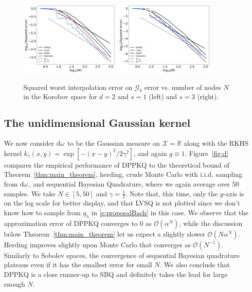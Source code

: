 \documentclass[twoside,11pt]{book}
\numberwithin{theorem}{chapter}
\numberwithin{definition}{chapter}
\numberwithin{proposition}{chapter}
\numberwithin{corollary}{chapter}
\numberwithin{example}{chapter}
\numberwithin{lemma}{chapter}
\newcommand{\rb}[1]{\textcolor{magenta}{#1}}
\begin{document}
\begin{figure}
\centering
\includegraphics[width=0.45\textwidth]{img/neurips/multiSobolev/suponunitball_interpolation_Korobov_s_1_binarycubeM_16_fig_1.pdf}
\includegraphics[width=0.45\textwidth]{img/neurips/multiSobolev/suponunitball_interpolation_Korobov_s_2_binarycubeM_16_fig_1.pdf}
\caption{Squared worst interpolation error on $\mathcal{G}_{4}$ error vs. number of nodes $N$ in the Korobov space for $d=2$ and $s = 1$ (left) and $s=3$ (right).
\label{fig:Korobov_DPPKQ_suponunitball_results_G4}}
\end{figure} 




\subsection{The unidimensional Gaussian kernel}\label{s:gaussian_numsim}
We now consider $\rm{d}\omega$ to be the Gaussian measure on $\mathcal{X} = \mathbb{R}$ along with the RKHS kernel $\displaystyle k_{\gamma}(x,y) = \exp[-(x-y)^{2}/2\gamma^{2}]$, and again $g\equiv 1$. Figure~\ref{fig:d} compares the empirical performance of DPPKQ to the theoretical bound of Theorem~\ref{thm:main_theorem}, herding, crude Monte Carlo with i.i.d. sampling from $\rm{d}\omega$, and sequential Bayesian Quadrature, where we again average over $50$ samples.
We take $N \in [5,50]$ and $\gamma = \frac{1}{2}$. Note that, this time, only the $y$-axis is on the log scale for better display, and that LVSQ is not plotted since we don't know how to sample from $q_\lambda$ in \eqref{e:proposalBach} in this case.
%
We observe that the approximation error of DPPKQ converges to $0$ as $\mathcal{O}(\alpha^{N})$, while the discussion below Theorem~\ref{thm:main_theorem} let us expect a slightly slower $\mathcal{O}(N\alpha^{N})$. Herding improves slightly upon Monte Carlo that converges as $\mathcal{O}(N^{-1})$. Similarly to Sobolev spaces, the convergence of sequential Bayesian quadrature plateaus even if it has the smallest error for small $N$.
We also conclude that DPPKQ is a close runner-up to SBQ and definitely takes the lead for large enough $N$.
\end{document}
